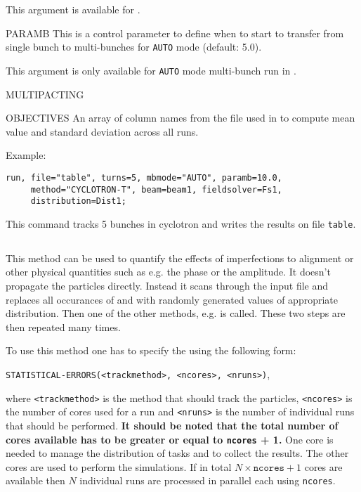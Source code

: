 \begin{kdescription}
  This argument is available for \opalcycl.

  \item[PARAMB]
   This is a control parameter to define when to start to transfer from single bunch to multi-bunches for \texttt{AUTO} mode (default: 5.0).

   This argument is only available for \texttt{AUTO} mode multi-bunch run in \opalcycl.

   \item[MULTIPACTING] 
   \item[OBJECTIVES] An array of column names from the  file used in  to compute mean value and standard deviation across all runs.
\end{kdescription}
Example:
\begin{verbatim}
run, file="table", turns=5, mbmode="AUTO", paramb=10.0,
     method="CYCLOTRON-T", beam=beam1, fieldsolver=Fs1,
     distribution=Dist1;
\end{verbatim}

This command tracks 5 bunches in cyclotron and writes the results on file \texttt{table}.

\subsection{}
\label{ssec:statistical-errors}
This method can be used to quantify the effects of imperfections to alignment or other physical quantities such as e.g. the phase or the amplitude. It doesn't propagate the particles directly. Instead it scans through the input file and replaces all occurances of  and  with randomly generated values of appropriate distribution. Then one of the other methods, e.g.  is called. These two steps are then repeated many times.

To use this method one has to specify the  using the following form:
\begin{center}
\texttt{STATISTICAL-ERRORS(<track{\textunderscore}method>, <ncores>, <nruns>)},
\end{center}
\noindent where \texttt{<track{\textunderscore}method>} is the method that should track the particles, \texttt{<ncores>} is the number of cores used for a run and \texttt{<nruns>} is the number of individual runs that should be performed. \textbf{It should be noted that the total number of cores available has to be greater or equal to \texttt{ncores} + 1.} One core is needed to manage the distribution of tasks and to collect the results. The other cores are used to perform the simulations. If in total $N \times \texttt{ncores} + 1$ cores are available then $N$ individual runs are processed in parallel each using \texttt{ncores}.

